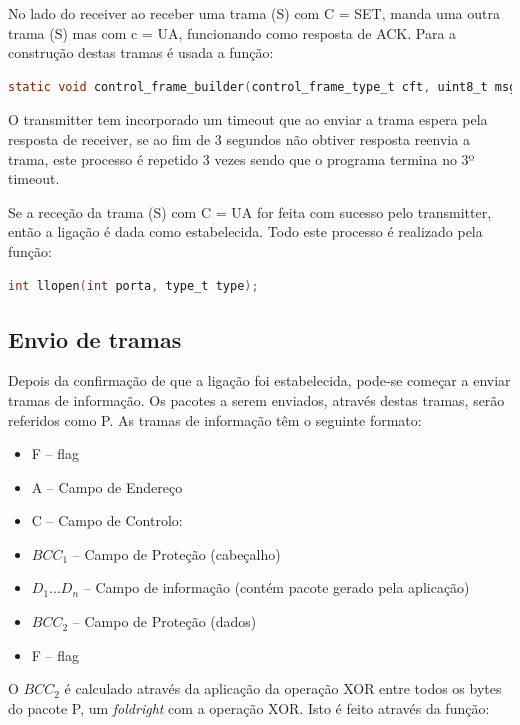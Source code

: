 \documentclass[a4paper,11pt,portuguese]{article}
\begin{document}
    No lado do receiver ao receber uma trama (S) com C = SET, manda uma outra trama (S) mas com c = UA,
    funcionando como resposta de ACK. Para a construção destas tramas é usada a função:
    
\begin{lstlisting}[language=C]
static void control_frame_builder(control_frame_type_t cft, uint8_t msg[]);    
\end{lstlisting}

    O transmitter tem incorporado um timeout que ao enviar a trama espera pela resposta de receiver, se
    ao fim de 3 segundos não obtiver resposta reenvia a trama, este processo é repetido 3 vezes sendo que
    o programa termina no 3º timeout.

    Se a receção da trama (S) com C = UA for feita com sucesso pelo transmitter, então a ligação é dada
    como estabelecida. Todo este processo é realizado pela função:

\begin{lstlisting}[language=C]
int llopen(int porta, type_t type);    
\end{lstlisting}

    \subsection{Envio de tramas}

    Depois da confirmação de que a ligação foi estabelecida, pode-se começar a enviar tramas de
    informação. Os pacotes a serem enviados, através destas tramas, serão referidos como P. As tramas de 
    informação têm o seguinte formato:

    \begin{itemize}
        \item F -- flag
        \item A -- Campo de Endereço
        \item C -- Campo de Controlo:
        \item $BCC_1$ -- Campo de Proteção (cabeçalho)
        \item $D_1...D_n$ -- Campo de informação (contém pacote gerado pela aplicação)
        \item $BCC_2$ -- Campo de Proteção (dados)
        \item F -- flag
    \end{itemize}

    O $BCC_2$ é calculado através da aplicação da operação XOR entre todos os bytes do pacote P, 
    um \textit{foldright} com a operação XOR. Isto é feito através da função:
\end{document}
